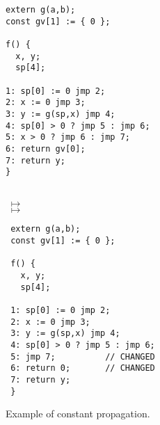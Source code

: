 
\begin{figure}
\noindent
\begin{minipage}{0.5\columnwidth}
\small
\begin{verbatim}
extern g(a,b);
const gv[1] := { 0 };

f() {
  x, y;
  sp[4];

1: sp[0] := 0 jmp 2;
2: x := 0 jmp 3;
3: y := g(sp,x) jmp 4;
4: sp[0] > 0 ? jmp 5 : jmp 6;
5: x > 0 ? jmp 6 : jmp 7;
6: return gv[0];
7: return y;
}
\end{verbatim}
\end{minipage}
\begin{minipage}{0.05\columnwidth}
\mbox{}\\[4.0cm]
$\;\mapsto$\\[0.00cm]
$\;\mapsto$\\
\end{minipage}
\begin{minipage}{0.4\columnwidth}
\small
\begin{verbatim}
 extern g(a,b);
 const gv[1] := { 0 };
 
 f() {
   x, y;
   sp[4];
 
 1: sp[0] := 0 jmp 2;
 2: x := 0 jmp 3;
 3: y := g(sp,x) jmp 4;
 4: sp[0] > 0 ? jmp 5 : jmp 6;
 5: jmp 7;          // CHANGED
 6: return 0;       // CHANGED
 7: return y;
 }
\end{verbatim}
\end{minipage}
\caption{Example of constant propagation.}
\label{fig:const-prop-example}
\end{figure}


